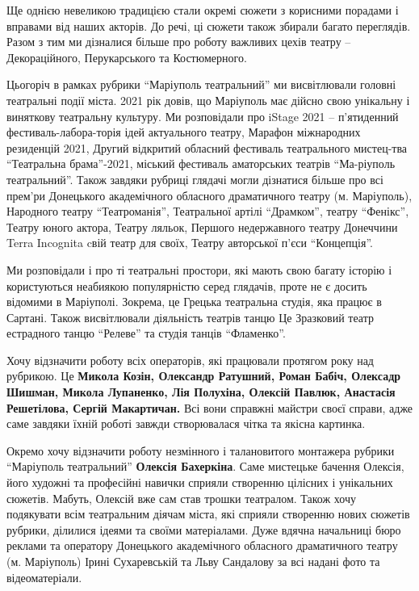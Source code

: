 Ще однією невеликою традицією стали окремі сюжети з корисними порадами і
вправами від наших акторів. До речі, ці сюжети також збирали багато переглядів.
Разом з тим ми дізналися більше про роботу важливих цехів театру –
Декораційного, Перукарського та Костюмерного.


Цьогоріч  в рамках рубрики \enquote{Маріуполь театральний} ми висвітлювали головні
театральні події міста. 2021 рік довів, що Маріуполь має дійсно свою унікальну
і виняткову театральну культуру. Ми розповідали про iStage 2021 –  п'ятиденний
фестиваль-лабора\hyp{}торія ідей актуального театру, Марафон міжнародних резиденцій
2021, Другий відкритий обласний фестиваль театрального мистец\hyp{}тва \enquote{Театральна
брама}-2021, міський фестиваль  аматорських театрів \enquote{Ма\hyp{}ріуполь театральний}.
Також завдяки рубриці глядачі могли дізнатися більше про всі прем'ри Донецького
академічного обласного драматичного театру (м. Маріуполь), Народного театру
\enquote{Театроманія}, Театральної артілі \enquote{Драмком}, театру \enquote{Фенікс}, Театру юного
актора, Театру ляльок, Першого недержавного театру Донеччини Terra Incognita
cвій театр для своїх, Театру авторської п'єси \enquote{Концепція}.


Ми розповідали і про ті театральні простори, які мають свою багату історію і
користуються неабиякою популярністю серед глядачів, проте не є досить відомими
в Маріуполі. Зокрема, це Грецька театральна студія, яка працює в Сартані. Також
висвітлювали діяльність театрів танцю Це Зразковий театр естрадного танцю
\enquote{Релеве} та студія танців \enquote{Фламенко}.


Хочу відзначити роботу всіх операторів, які працювали протягом року  над
рубрикою. Це \textbf{Микола Козін, Олександр Ратушний,  Роман Бабіч, Олексадр Шишман,
Микола Лупаненко, Лія Полухіна, Олексій Павлюк, Анастасія Решетілова, Сергій
Макартичан.} Всі вони справжні майстри своєї справи, адже саме завдяки їхній
роботі завжди створювалася чітка та якісна картинка.

Окремо хочу відзначити роботу незмінного і талановитого монтажера рубрики
\enquote{Маріуполь театральний} \textbf{Олексія Бахеркіна}. Саме мистецьке бачення Олексія, його
художні та професійні навички сприяли створенню цілісних і унікальних сюжетів.
Мабуть, Олексій вже  сам став трошки театралом. Також хочу подякувати всім
театральним діячам міста, які сприяли створенню нових сюжетів рубрики, ділилися
ідеями та своїми матеріалами. Дуже вдячна начальниці бюро реклами та оператору
Донецького академічного обласного драматичного театру (м. Маріуполь) Ірині
Сухаревській та Льву Сандалову за всі надані фото та відеоматеріали.

